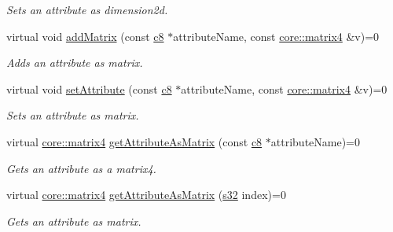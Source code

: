 \begin{DoxyCompactItemize}
\begin{DoxyCompactList}\small\item\em Sets an attribute as dimension2d. \end{DoxyCompactList}\item 
\mbox{\label{classirr_1_1io_1_1IAttributes_a766631588618287f20af1f66f21fca3d}} 
virtual void \hyperlink{classirr_1_1io_1_1IAttributes_a766631588618287f20af1f66f21fca3d}{add\+Matrix} (const \hyperlink{namespaceirr_a9395eaea339bcb546b319e9c96bf7410}{c8} $\ast$attribute\+Name, const \hyperlink{namespaceirr_1_1core_a4c9d4e29899535971052810954a14431}{core\+::matrix4} \&v)=0
\begin{DoxyCompactList}\small\item\em Adds an attribute as matrix. \end{DoxyCompactList}\item 
\mbox{\label{classirr_1_1io_1_1IAttributes_ad722717549e321ad37e6a63a9dde6365}} 
virtual void \hyperlink{classirr_1_1io_1_1IAttributes_ad722717549e321ad37e6a63a9dde6365}{set\+Attribute} (const \hyperlink{namespaceirr_a9395eaea339bcb546b319e9c96bf7410}{c8} $\ast$attribute\+Name, const \hyperlink{namespaceirr_1_1core_a4c9d4e29899535971052810954a14431}{core\+::matrix4} \&v)=0
\begin{DoxyCompactList}\small\item\em Sets an attribute as matrix. \end{DoxyCompactList}\item 
virtual \hyperlink{namespaceirr_1_1core_a4c9d4e29899535971052810954a14431}{core\+::matrix4} \hyperlink{classirr_1_1io_1_1IAttributes_a0329ce7827096c56f3c7e905afe04ced}{get\+Attribute\+As\+Matrix} (const \hyperlink{namespaceirr_a9395eaea339bcb546b319e9c96bf7410}{c8} $\ast$attribute\+Name)=0
\begin{DoxyCompactList}\small\item\em Gets an attribute as a matrix4. \end{DoxyCompactList}\item 
virtual \hyperlink{namespaceirr_1_1core_a4c9d4e29899535971052810954a14431}{core\+::matrix4} \hyperlink{classirr_1_1io_1_1IAttributes_aaceb2fc0fca684d941918ce18d876336}{get\+Attribute\+As\+Matrix} (\hyperlink{namespaceirr_ac66849b7a6ed16e30ebede579f9b47c6}{s32} index)=0
\begin{DoxyCompactList}\small\item\em Gets an attribute as matrix. \end{DoxyCompactList}\item 

\end{DoxyCompactItemize}
